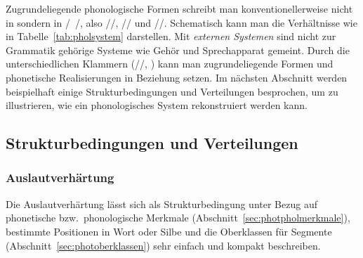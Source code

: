 \begin{table}
  \caption{Lexikon, Phonologie und Phonetik}
  \label{tab:pholsystem}
\end{table}

Zugrundeliegende phonologische Formen schreibt man konventionellerweise nicht in \textipa{[~]} sondern in /~/, also \zB //, // und //.
Schematisch kann man die Verhältnisse wie in Tabelle~\ref{tab:pholsystem} darstellen.
Mit \textit{externen Systemen} sind nicht zur Grammatik gehörige Systeme wie Gehör und Sprechapparat gemeint.
Durch die unterschiedlichen Klammern (//, \textipa{[ba:t]}) kann man zugrundeliegende Formen und phonetische Realisierungen in Beziehung setzen.
Im nächsten Abschnitt werden beispielhaft einige Strukturbedingungen und Verteilungen besprochen, um zu illustrieren, wie ein phonologisches System rekonstruiert werden kann.

\subsection{Strukturbedingungen und Verteilungen}

\subsubsection{Auslautverhärtung}

\label{sec:prozauslautverh}

Die Auslautverhärtung lässt sich als Strukturbedingung unter Bezug auf phonetische bzw.\ phonologische Merkmale (Abschnitt~\ref{sec:photpholmerkmale}), bestimmte Positionen in Wort oder Silbe und die Oberklassen für Segmente (Abschnitt~\ref{sec:photoberklassen}) sehr einfach und kompakt beschreiben.


